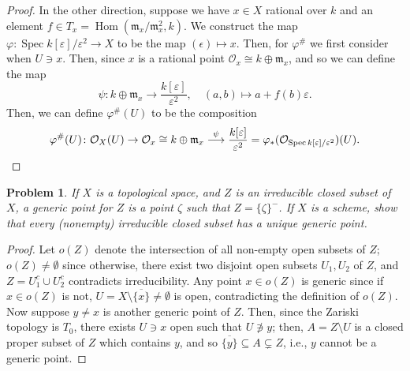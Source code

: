 \documentclass[12pt,letterpaper]{article}
\newtheorem{problem}{Problem}[section]
\theoremstyle{definition}
\theoremstyle{remark}
\numberwithin{equation}{section}
\numberwithin{figure}{problem}
\DeclareMathOperator{\Spec}{Spec}
\DeclareMathOperator{\Hom}{Hom}
\newcommand{\OO}{\mathcal{O}}
\begin{document}
\begin{proof}
  \par In the other direction, suppose we have $x \in X$ rational over $k$ and an element $f \in T_x = \Hom(\mathfrak{m}_x/\mathfrak{m}_x^2,k)$. We construct the map $\varphi\colon\Spec k[\varepsilon]/\varepsilon^2 \to X$ to be the map $(\epsilon) \mapsto x$. Then, for $\varphi^\#$ we first consider when $U \ni x$. Then, since $x$ is a rational point $\OO_x \cong k \oplus \mathfrak{m}_x$, and so we can define the map
  \begin{equation*}
    \psi\colon k \oplus \mathfrak{m}_x \to \frac{k[\varepsilon]}{\varepsilon^2}, \quad (a,b) \mapsto a + f(b)\varepsilon.
  \end{equation*}
  Then, we can define $\varphi^\#(U)$ to be the composition
  \begin{equation*}
    \varphi^\#(U)\colon \OO_X(U) \to \OO_x \cong k \oplus \mathfrak{m}_x \overset{\psi}{\longrightarrow} \frac{k[\varepsilon]}{\varepsilon^2} = \varphi_*(\OO_{\Spec k[\varepsilon]/\varepsilon^2})(U).\qedhere
  \end{equation*}
\end{proof}

\begin{problem}
  If $X$ is a topological space, and $Z$ is an irreducible closed subset of $X$, a \emph{generic point} for $Z$ is a point $\zeta$ such that $Z = \{\zeta\}^-$. If $X$ is a scheme, show that every (nonempty) irreducible closed subset has a unique generic point.
\end{problem}
\begin{proof}
  Let $o(Z)$ denote the intersection of all non-empty open subsets of $Z$; $o(Z) \ne \emptyset$ since otherwise, there exist two disjoint open subsets $U_1,U_2$ of $Z$, and $Z = U_1^c \cup U_2^c$ contradicts irreducibility. Any point $x \in o(Z)$ is generic since if $x \in o(Z)$ is not, $U = X \setminus \overline{\{x\}} \ne \emptyset$ is open, contradicting the definition of $o(Z)$. Now suppose $y \ne x$ is another generic point of $Z$. Then, since the Zariski topology is $T_0$, there exists $U \ni x$ open such that $U \not\ni y$; then, $A = Z \setminus U$ is a closed proper subset of $Z$ which contains $y$, and so $\overline{\{y\}} \subseteq A \subsetneq Z$, i.e., $y$ cannot be a generic point.
\end{proof}
\end{document}
